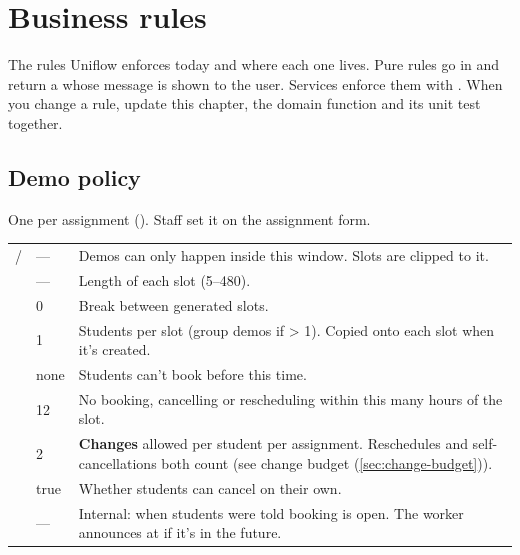\chapter{Business rules}\label{ch:rules}

The rules Uniflow enforces today and where each one lives. Pure rules go in  and return a  whose message is shown to the user. Services enforce them with . When you change a rule, update this chapter, the domain function and its unit test together.

\section{Demo policy}

One  per assignment (). Staff set it on the assignment form.

{\tablefont
\begin{xltabular}{\linewidth}{@{}P{30mm} P{16mm} L@{}}
  \toprule
   &  & \\
  \midrule
  \endhead
   /  & --- & Demos can only happen inside this window. Slots are clipped to it.\\
   & --- & Length of each slot (5--480).\\
   & 0 & Break between generated slots.\\
   & 1 & Students per slot (group demos if > 1). Copied onto each slot when it's created.\\
   & none & Students can't book before this time.\\
   & 12 & No booking, cancelling or rescheduling within this many hours of the slot.\\
   & 2 & \textbf{Changes} allowed per student per assignment. Reschedules and self-cancellations both count (see change budget (\cref{sec:change-budget})).\\
   & true & Whether students can cancel on their own.\\
   & --- & Internal: when students were told booking is open. The worker announces at  if it's in the future.\\
  \bottomrule
\end{xltabular}}

